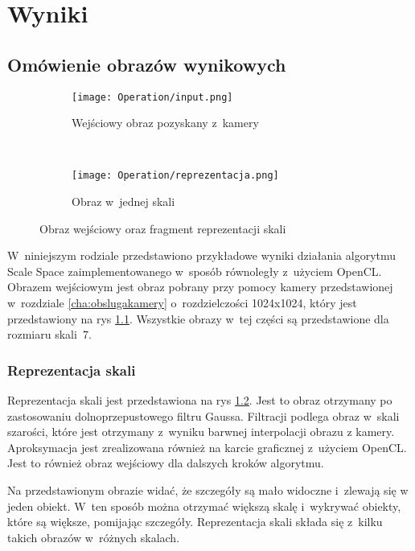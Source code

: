 \chapter{Wyniki}
\label{cha:wyniki}

\section{Omówienie obrazów wynikowych}
\label{sec:testy}

\begin{figure}[h]
\begin{center}

\begin{subfigure}[t]{0.3\textwidth}
\texttt{[image: Operation/input.png]}
\caption{Wejściowy obraz pozyskany z~kamery}
\label{fig:input}
\end{subfigure}
~
\begin{subfigure}[t]{0.3\textwidth}
\texttt{[image: Operation/reprezentacja.png]}
\caption{Obraz w~jednej skali}
\label{fig:dzialanieRep}
\end{subfigure}

\end{center}
\label{fig:inputIDzialanie}
\caption{Obraz wejściowy oraz fragment reprezentacji skali}
\end{figure}

W~niniejszym rodziale przedstawiono przykładowe wyniki działania algorytmu Scale Space zaimplementowanego w~sposób równoległy z~użyciem OpenCL. Obrazem wejściowym jest obraz pobrany przy pomocy kamery przedstawionej w~rozdziale \ref{cha:obslugakamery} o~rozdzielczości 1024x1024, który jest przedstawiony na rys \ref{fig:input}. Wszystkie obrazy w~tej części są przedstawione dla rozmiaru skali~7.

\subsection{Reprezentacja skali}
\label{sec:dzialanieRep}

Reprezentacja skali jest przedstawiona na rys \ref{fig:dzialanieRep}. Jest to obraz otrzymany po zastosowaniu dolnoprzepustowego filtru Gaussa. Filtracji podlega obraz w~skali szarości, które jest otrzymany z~wyniku barwnej interpolacji obrazu z kamery. Aproksymacja jest zrealizowana również na karcie graficznej z~użyciem OpenCL. Jest to również obraz wejściowy dla dalszych kroków algorytmu.

Na przedstawionym obrazie widać, że szczegóły są mało widoczne i~zlewają się w jeden obiekt. W~ten sposób można otrzymać większą skalę i~wykrywać obiekty, które są większe, pomijając szczegóły. Reprezentacja skali składa się z~kilku takich obrazów w~różnych skalach.


